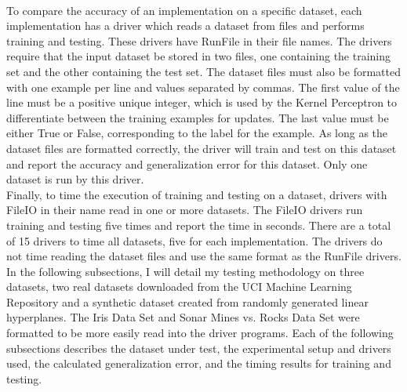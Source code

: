 \\To compare the accuracy of an implementation on a specific dataset, each implementation has a driver which reads a dataset from files and performs training and testing. These drivers have RunFile in their file names. The drivers require that the input dataset be stored in two files, one containing the training set and the other containing the test set. The dataset files must also be formatted with one example per line and values separated by commas. The first value of the line must be a positive unique integer, which is used by the Kernel Perceptron to differentiate between the training examples for updates. The last value must be either True or False, corresponding to the label for the example. As long as the dataset files are formatted correctly, the driver will train and test on this dataset and report the accuracy and generalization error for this dataset. Only one dataset is run by this driver.
\\Finally, to time the execution of training and testing on a dataset, drivers with FileIO in their name read in one or more datasets. The FileIO drivers run training and testing five times and report the time in seconds. There are a total of 15 drivers to time all datasets, five for each implementation. The drivers do not time reading the dataset files and use the same format as the RunFile drivers. 
\\In the following subsections, I will detail my testing methodology on three datasets, two real datasets downloaded from the UCI Machine Learning Repository \cite{DG17} and a synthetic dataset created from randomly generated linear hyperplanes. The Iris Data Set \cite{Fis36} and Sonar Mines vs. Rocks Data Set \cite{SG88} were formatted to be more easily read into the driver programs. Each of the following subsections describes the dataset under test, the experimental setup and drivers used, the calculated generalization error, and the timing results for training and testing.
